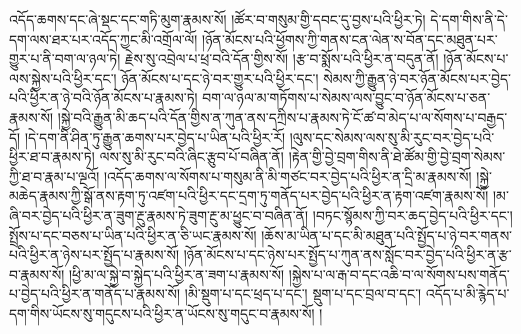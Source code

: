 འདོད་ཆགས་དང་ཞེ་སྡང་དང་གཏི་མུག་རྣམས་སོ། །ཚོར་བ་གསུམ་གྱི་དབང་དུ་བྱས་པའི་ཕྱིར་ཏེ། དེ་དག་གིས་ནི་དེ་དག་ལས་ཐར་པར་འདོད་ཀྱང་མི་འགྲོལ་ལོ། །ཉོན་མོངས་པའི་ཕྱོགས་ཀྱི་གནས་ངན་ལེན་ས་བོན་དང་མཐུན་པར་གྱུར་པ་ནི་བག་ལ་ཉལ་ཏེ། རྗེས་སུ་འབྲེལ་པ་ཕྲ་བའི་དོན་གྱིས་སོ། །རྩ་བ་སྨོས་པའི་ཕྱིར་ན་བདུན་ནོ། །ཉོན་མོངས་པ་ལས་སྐྱེས་པའི་ཕྱིར་དང་། ཉོན་མོངས་པ་དང་ཉེ་བར་གྱུར་པའི་ཕྱིར་དང་། སེམས་ཀྱི་རྒྱུན་ཉེ་བར་ཉོན་མོངས་པར་བྱེད་པའི་ཕྱིར་ན་ཉེ་བའི་ཉོན་མོངས་པ་རྣམས་ཏེ། བག་ལ་ཉལ་མ་གཏོགས་པ་སེམས་ལས་བྱུང་བ་ཉོན་མོངས་པ་ཅན་རྣམས་སོ། །སྐྱེ་བའི་རྒྱུན་མི་ཆད་པའི་དོན་གྱིས་ན་ཀུན་ནས་དཀྲིས་པ་རྣམས་ཏེ་ངོ་ཚ་བ་མེད་པ་ལ་སོགས་པ་བརྒྱད་དོ། །དེ་དག་ནི་ཤིན་ཏུ་རྒྱུན་ཆགས་པར་བྱེད་པ་ཡིན་པའི་ཕྱིར་རོ། །ལུས་དང་སེམས་ལས་སུ་མི་རུང་བར་བྱེད་པའི་ཕྱིར་ཐ་བ་རྣམས་ཏེ། ལས་སུ་མི་རུང་བའི་ཞིང་རྩུབ་པོ་བཞིན་ནོ། །རྟེན་གྱི་བྱེ་བྲག་གིས་ནི་ཐེ་ཚོམ་གྱི་བྱེ་བྲག་སེམས་ཀྱི་ཐ་བ་རྣམ་པ་ལྔའོ། །འདོད་ཆགས་ལ་སོགས་པ་གསུམ་ནི་མི་གཙང་བར་བྱེད་པའི་ཕྱིར་ན་དྲི་མ་རྣམས་སོ། །སྐྱེ་མཆེད་རྣམས་ཀྱི་སྒོ་ནས་རྟག་ཏུ་འཛག་པའི་ཕྱིར་དང་དྲག་ཏུ་གནོད་པར་བྱེད་པའི་ཕྱིར་ན་རྟག་འཛག་རྣམས་སོ། །མ་ཞི་བར་བྱེད་པའི་ཕྱིར་ན་ཟུག་རྔུ་རྣམས་ཏེ་ཟུག་རྔུ་མ་ཕྱུང་བ་བཞིན་ནོ། །བཏང་སྙོམས་ཀྱི་བར་ཆད་བྱེད་པའི་ཕྱིར་དང་། སྤྲོས་པ་དང་བཅས་པ་ཡིན་པའི་ཕྱིར་ན་ཅི་ཡང་རྣམས་སོ། །ཆོས་མ་ཡིན་པ་དང་མི་མཐུན་པའི་སྤྱོད་པ་ཉེ་བར་གནས་པའི་ཕྱིར་ན་ཉེས་པར་སྤྱོད་པ་རྣམས་སོ། །ཉོན་མོངས་པ་དང་ཉེས་པར་སྤྱོད་པ་ཀུན་ནས་སློང་བར་བྱེད་པའི་ཕྱིར་ན་རྩ་བ་རྣམས་སོ། །ཕྱི་མ་ལ་སྐྱེ་བ་སྐྱེད་པའི་ཕྱིར་ན་ཟག་པ་རྣམས་སོ། །སྐྱེས་པ་ལ་རྒ་བ་དང་འཆི་བ་ལ་སོགས་པས་གནོད་པ་བྱེད་པའི་ཕྱིར་ན་གནོད་པ་རྣམས་སོ། །མི་སྡུག་པ་དང་ཕྲད་པ་དང་། སྡུག་པ་དང་བྲལ་བ་དང་། འདོད་པ་མི་རྙེད་པ་དག་གིས་ཡོངས་སུ་གདུངས་པའི་ཕྱིར་ན་ཡོངས་སུ་གདུང་བ་རྣམས་སོ། །
